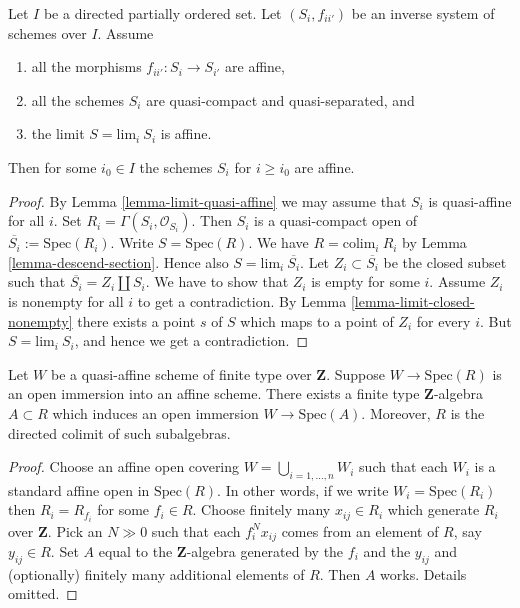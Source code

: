 \begin{lemma}
\label{lemma-limit-affine}
Let $I$ be a directed partially ordered set.
Let $(S_i, f_{ii'})$ be an inverse system of
schemes over $I$. Assume
\begin{enumerate}
\item all the morphisms $f_{ii'} : S_i \to S_{i'}$ are affine,
\item all the schemes $S_i$ are quasi-compact and quasi-separated, and
\item the limit $S = \text{lim}_i\ S_i$ is affine.
\end{enumerate}
Then for some $i_0 \in I$ the schemes $S_i$ for $i \geq i_0$
are affine.
\end{lemma}

\begin{proof}
By Lemma \ref{lemma-limit-quasi-affine} we may assume that
$S_i$ is quasi-affine for all $i$. Set $R_i = \Gamma(S_i, \mathcal{O}_{S_i})$.
Then $S_i$ is a quasi-compact open of $\overline{S_i} := \text{Spec}(R_i)$.
Write $S = \text{Spec}(R)$. We have $R = \text{colim}_i\ R_i$
by Lemma \ref{lemma-descend-section}.
Hence also $S = \text{lim}_i\ \overline{S_i}$.
Let $Z_i \subset \overline{S_i}$ be the closed subset such that
$\overline{S_i} = Z_i \coprod S_i$.
We have to show that $Z_i$ is empty for some $i$.
Assume $Z_i$ is nonempty for all $i$ to get a contradiction.
By Lemma \ref{lemma-limit-closed-nonempty} there exists
a point $s$ of $S$ which maps to a point of $Z_i$ for every $i$.
But $S = \text{lim}_i\ S_i$, and hence we get a contradiction.
\end{proof}

\begin{lemma}
\label{lemma-quasi-affine-finite-type-over-Z}
Let $W$ be a quasi-affine scheme of finite type over
$\mathbf{Z}$. Suppose $W \to \text{Spec}(R)$ is an
open immersion into an affine scheme. There exists a
finite type $\mathbf{Z}$-algebra $A \subset R$
which induces an open immersion $W \to \text{Spec}(A)$.
Moreover, $R$ is the directed colimit of such subalgebras.
\end{lemma}

\begin{proof}
Choose an affine open covering $W = \bigcup_{i = 1, \ldots, n} W_i$
such that each $W_i$ is a standard affine open in $\text{Spec}(R)$.
In other words, if we write $W_i = \text{Spec}(R_i)$
then $R_i = R_{f_i}$ for some $f_i \in R$.
Choose finitely many $x_{ij} \in R_i$ which generate
$R_i$ over $\mathbf{Z}$.
Pick an $N \gg 0$ such that each $f_i^Nx_{ij}$ comes from an
element of $R$, say $y_{ij} \in R$.
Set $A$ equal to the $\mathbf{Z}$-algebra generated by
the $f_i$ and the $y_{ij}$ and (optionally) finitely many
additional elements of $R$. Then $A$ works. Details omitted.
\end{proof}

